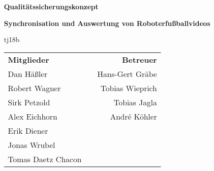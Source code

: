 \begin{titlepage}
	\begin{center}
		{\Huge\textbf{Qualitätssicherungskonzept}\vspace{2em}}

		{\Large\textbf{Synchronisation und Auswertung von Roboterfußballvideos}\vspace{1em}}

		{\textsf{tj18b}\vspace{2em}}

		\begin{table}[b]
			\begin{tabularx}{\textwidth}{lXr}
				\textbf{Mitglieder}&&\textbf{Betreuer}\\
				Dan Häßler&&Hans-Gert Gräbe\\
				Robert Wagner&&Tobias Wieprich\\
				Sirk Petzold&&Tobias Jagla\\
				Alex Eichhorn&&André Köhler\\
				Erik Diener&&\\
				Jonas Wrubel&&\\
				Tomas Daetz Chacon&&\\
			\end{tabularx}
		\end{table}
	\end{center}
\end{titlepage}
